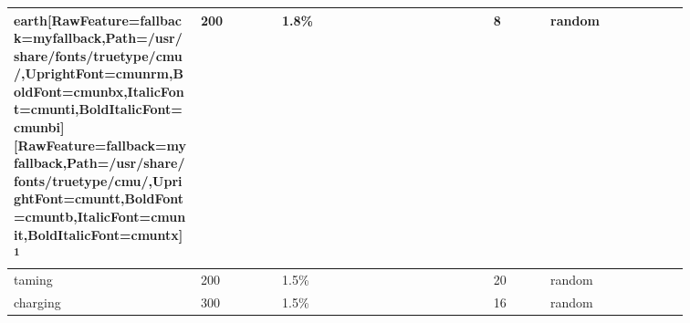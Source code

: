 \begin{longtable}{|>{\RaggedRight}p{0.23497\linewidth}|>{\RaggedRight}p{0.10823\linewidth}|>{\RaggedRight}p{0.26606\linewidth}|>{\RaggedRight}p{0.07394\linewidth}|>{\RaggedRight}p{0.17393\linewidth}|}
\hspace*{0pt}\ignorespaces{}\hspace*{0pt}earth\footnotemark[52]\allowbreak{}\setmainfont{cmunrm.ttf}[RawFeature={fallback=myfallback},Path=/usr/share/fonts/truetype/cmu/,UprightFont=cmunrm,BoldFont=cmunbx,ItalicFont=cmunti,BoldItalicFont=cmunbi]\setmonofont{cmunrm.ttf}[RawFeature={fallback=myfallback},Path=/usr/share/fonts/truetype/cmu/,UprightFont=cmuntt,BoldFont=cmuntb,ItalicFont=cmunit,BoldItalicFont=cmuntx]\textsuperscript{1}&\hspace*{0pt}\ignorespaces{}\hspace*{0pt}200&\hspace*{0pt}\ignorespaces{}\hspace*{0pt}1.8\%&\hspace*{0pt}\ignorespaces{}\hspace*{0pt}8&\hspace*{0pt}\ignorespaces{}\hspace*{0pt}random\footnotemark[53]\\ \hline \hspace*{0pt}\ignorespaces{}\hspace*{0pt}taming\footnotemark[54]&\hspace*{0pt}\ignorespaces{}\hspace*{0pt}200&\hspace*{0pt}\ignorespaces{}\hspace*{0pt}1.5\%&\hspace*{0pt}\ignorespaces{}\hspace*{0pt}20&\hspace*{0pt}\ignorespaces{}\hspace*{0pt}random\footnotemark[55]\\ \hline \hspace*{0pt}\ignorespaces{}\hspace*{0pt}charging\footnotemark[56]&\hspace*{0pt}\ignorespaces{}\hspace*{0pt}300&\hspace*{0pt}\ignorespaces{}\hspace*{0pt}1.5\%&\hspace*{0pt}\ignorespaces{}\hspace*{0pt}16&\hspace*{0pt}\ignorespaces{}\hspace*{0pt}random\footnotemark[57]\\ \hline 
\end{longtable}

